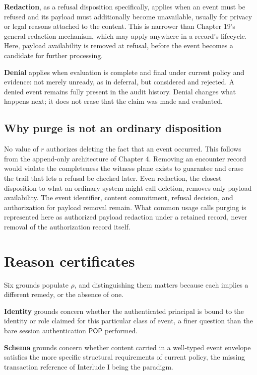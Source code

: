 \documentclass[11pt,openany]{book}
\newcommand{\Pop}{\mathsf{POP}}
\begin{document}
\textbf{Redaction}, as a refusal disposition specifically, applies when an
event must be refused and its payload must additionally become unavailable,
usually for privacy or legal reasons attached to the content. This is narrower
than Chapter 19's general redaction mechanism, which may apply anywhere in a
record's lifecycle. Here, payload availability is removed at refusal, before
the event becomes a candidate for further processing.

\textbf{Denial} applies when evaluation is complete and final under current
policy and evidence: not merely unready, as in deferral, but considered and
rejected. A denied event remains fully present in the audit history. Denial
changes what happens next; it does not erase that the claim was made and
evaluated.

\subsection{Why purge is not an ordinary disposition}

No value of \(r\) authorizes deleting the fact that an event occurred. This
follows from the append-only architecture of Chapter 4. Removing an encounter
record would violate the completeness the witness plane exists to guarantee
and erase the trail that lets a refusal be checked later. Even redaction, the
closest disposition to what an ordinary system might call deletion, removes
only payload availability. The event identifier, content commitment, refusal
decision, and authorization for payload removal remain. What common usage
calls purging is represented here as authorized payload redaction under a
retained record, never removal of the authorization record itself.

\section{Reason certificates}

Six grounds populate \(\rho\), and distinguishing them matters because each
implies a different remedy, or the absence of one.

\textbf{Identity} grounds concern whether the authenticated principal is bound
to the identity or role claimed for this particular class of event, a finer
question than the bare session authentication \(\Pop\) performed.

\textbf{Schema} grounds concern whether content carried in a well-typed event
envelope satisfies the more specific structural requirements of current
policy, the missing transaction reference of Interlude I being the paradigm.
\end{document}
